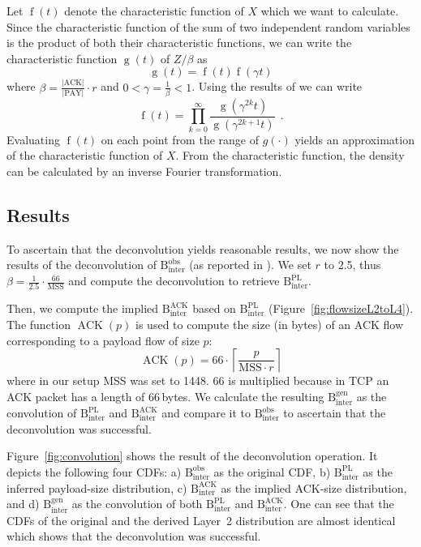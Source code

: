 \documentclass[journal,10pt]{IEEEtran}
\DeclareMathOperator{\ACK}{ACK}
\newcommand{\bytes}[2]{\ensuremath{\mathrm{B}^{\mathrm{#1}}_{\mathrm{#2}}}}
\begin{document}
	Let $\operatorname{f}(t)$ denote the characteristic function of $X$ which we want to calculate.
	Since the characteristic function of the sum of two independent random variables is the product of both their characteristic functions,
	we can write the characteristic function $\operatorname{g}(t)$ of $Z / \beta$ as
	\[\operatorname{g}(t) = \operatorname{f}(t) \operatorname{f}(\gamma t)\]
	where $\beta = \frac{|\mathrm{ACK}|}{|\mathrm{PAY}|} \cdot r$ and $0 < \gamma = \frac{1}{\beta} < 1$.
Using the results of \cite{arXiv:math/0306237} we can write
	\[ \operatorname{f}(t) = \prod_{k=0}^{\infty} \frac{\operatorname{g}(\gamma^{2k}t)}{\operatorname{g}(\gamma^{2k+1}t)} ~~.\]
	Evaluating $\operatorname{f}(t)$ on each point from the range of $g(\cdot)$ yields an approximation of the characteristic function of $X$.
	From the characteristic function, the density can be calculated by an inverse Fourier transformation.


\subsection{Results}
	To ascertain that the deconvolution yields reasonable results, we now show the results of the deconvolution of
	\bytes{obs}{inter} (as reported in \cite{MSR-datacenters}).
	We set $r$ to 2.5, thus $\beta = \frac{1}{2.5} \cdot \frac{66}{\mathrm{MSS}}$
	and compute the deconvolution to retrieve \bytes{PL}{inter}.
	
	Then, we compute the implied \bytes{ACK}{inter}
	based on \bytes{PL}{inter} (Figure~\ref{fig:flowsizeL2toL4}).
	The function $\ACK(p)$ is used to compute the size (in bytes) of an ACK flow corresponding to a payload flow of size $p$:
	\[ \ACK(p) = 66 \cdot \left\lceil \frac{p}{\mathrm{MSS} \cdot r} \right\rceil \]
	where in our setup MSS was set to 1448. 66 is multiplied because in TCP an ACK packet has a length of 66\,bytes.
	We calculate the resulting \bytes{gen}{inter} as the convolution of \bytes{PL}{inter} and \bytes{ACK}{inter} and
	compare it to \bytes{obs}{inter} to ascertain that the deconvolution was successful.


	Figure~\ref{fig:convolution} shows the result of the deconvolution operation.
	It depicts the following four CDFs: 
	a) \bytes{obs}{inter} as the original CDF,
	b) \bytes{PL}{inter} as the inferred payload-size distribution, 
	c) \bytes{ACK}{inter} as the implied ACK-size distribution, and
	d) \bytes{gen}{inter} as the convolution of both \bytes{PL}{inter} and \bytes{ACK}{inter}.
	One can see that the CDFs of the original and the derived Layer~2 distribution are almost identical which shows that the deconvolution
	was successful.
	
\end{document}
